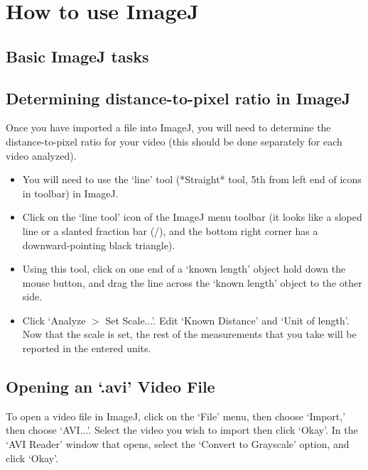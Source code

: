 \chapter{How to use ImageJ}
\thispagestyle{fancy}

\section{Basic ImageJ tasks}

\section*{Determining distance-to-pixel ratio in ImageJ}
Once you have imported a file into ImageJ, you will need to determine the distance-to-pixel ratio for your video (this should be done separately for each video analyzed). 
\begin{itemize}
\item You will need to use the `line' tool (*Straight* tool, 5th from left end of icons in toolbar) in ImageJ.
\item Click on the `line tool' icon of the ImageJ menu toolbar (it looks like a sloped line or a slanted fraction bar (/), and the bottom right corner has a downward-pointing black triangle). 
\item Using this tool, click on one end of a `known length’ object hold down the mouse button, and drag the line across the `known length’ object to the other side. 
\item Click `Analyze $>$ Set Scale...'. Edit `Known Distance' and `Unit of length'. Now that the scale is set, the rest of the measurements that you take will be reported in the entered units.
\end{itemize}

\section*{Opening an `.avi' Video File}
To open a video file in ImageJ, click on the `File' menu, then choose `Import,' then choose `AVI...'. 
Select the video you wish to import then click `Okay'. 
In the `AVI Reader' window that opens, select the `Convert to Grayscale' option, and click `Okay'.

